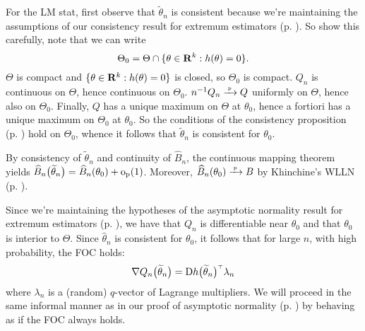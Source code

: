 \documentclass[11pt,letterpaper,reqno,oneside]{article}
\begin{document}
For the LM stat, first observe that $\widetilde{\theta}_n$ is consistent because we're maintaining the assumptions of our consistency result for extremum estimators (p. \pageref{proposition:weak_consistency}). So show this carefully, note that we can write
%
\begin{equation*}
	\Theta_0 = \Theta \cap \{ \theta \in \mathbf{R}^k : h(\theta)=0 \} .
\end{equation*}
%
$\Theta$ is compact and $\{ \theta \in \mathbf{R}^k : h(\theta)=0 \}$ is closed, so $\Theta_0$ is compact. $Q_n$ is continuous on $\Theta$, hence continuous on $\Theta_0$. $n^{-1} Q_n \xrightarrow{{\scriptscriptstyle \mathrm{\;p\;}}} Q$ uniformly on $\Theta$, hence also on $\Theta_0$. Finally, $Q$ has a unique maximum on $\Theta$ at $\theta_0$, hence a fortiori has a unique maximum on $\Theta_0$ at $\theta_0$. So the conditions of the consistency proposition (p. \pageref{proposition:weak_consistency}) hold on $\Theta_0$, whence it follows that $\widetilde{\theta}_n$ is consistent for $\theta_0$.

By consistency of $\widetilde{\theta}_n$ and continuity of $\widehat{B}_n$, the continuous mapping theorem yields $\widehat{B}_n\bigl( \widetilde{\theta}_n \bigr) = \widehat{B}_n(\theta_0) + \mathrm{o}_{\mathrm{p}}(1)$. Moreover, $\widehat{B}_n(\theta_0) \xrightarrow{{\scriptscriptstyle \mathrm{\;p\;}}} B$ by Khinchine's WLLN (p. \pageref{corollary:Khinchine_WLLN}).

Since we're maintaining the hypotheses of the asymptotic normality result for extremum estimators (p. \pageref{proposition:asymptotic_normality}), we have that $Q_n$ is differentiable near $\theta_0$ and that $\theta_0$ is interior to $\Theta$. Since $\widehat{\theta}_n$ is consistent for $\theta_0$, it follows that for large $n$, with high probability, the FOC holds:
%
\begin{equation*}
	\nabla Q_n\bigl( \widetilde{\theta}_n \bigr) 
	= \mathrm{D} h\bigl( \widetilde{\theta}_n \bigr)^{\scriptscriptstyle \top} \lambda_n
\end{equation*}
%
where $\lambda_n$ is a (random) $q$-vector of Lagrange multipliers. We will proceed in the same informal manner as in our proof of asymptotic normality (p. \pageref{proposition:asymptotic_normality}) by behaving as if the FOC always holds.
\end{document}
